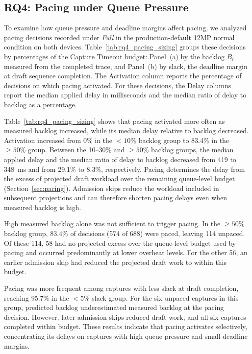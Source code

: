 \subsection{RQ4: Pacing under Queue Pressure}
\label{sec:rq4}



To examine how queue pressure and deadline margins affect pacing, we analyzed pacing decisions recorded under \emph{Full} in the production-default 12MP normal condition on both devices.
Table~\ref{tab:rq4_pacing_sizing} groups these decisions by percentages of the Capture Timeout budget: Panel~(a) by the backlog \(B_i\) measured from the completed trace, and Panel~(b) by slack, the deadline margin at draft sequence completion.
The Activation column reports the percentage of decisions on which pacing activated.
For these decisions, the Delay columns report the median applied delay in milliseconds and the median ratio of delay to backlog as a percentage.

Table~\ref{tab:rq4_pacing_sizing} shows that pacing activated more often as measured backlog increased, while its median delay relative to backlog decreased.
Activation increased from 0\% in the \(<10\%\) backlog group to 83.4\% in the \(\geq 50\%\) group.
Between the 10--30\% and \(\geq 50\%\) backlog groups, the median applied delay and the median ratio of delay to backlog decreased from 419 to 348~ms and from 29.1\% to 8.3\%, respectively.
Pacing determines the delay from the excess of projected draft workload over the remaining queue-level budget (Section~\ref{sec:pacing}).
Admission skips reduce the workload included in subsequent projections and can therefore shorten pacing delays even when measured backlog is high.

High measured backlog alone was not sufficient to trigger pacing.
In the \(\geq 50\%\) backlog group, 83.4\% of decisions (574 of 688) were paced, leaving 114 unpaced.
Of these 114, 58 had no projected excess over the queue-level budget used by pacing and occurred predominantly at lower overheat levels.
For the other 56, an earlier admission skip had reduced the projected draft work to within this budget.

Pacing was more frequent among captures with less slack at draft completion, reaching 95.7\% in the \(<5\%\) slack group.
For the six unpaced captures in this group, predicted backlog underestimated measured backlog at the pacing decision.
However, later admission skips reduced draft work, and all six captures completed within budget.
These results indicate that pacing activates selectively, concentrating its delays on captures with high queue pressure and small deadline margins.
